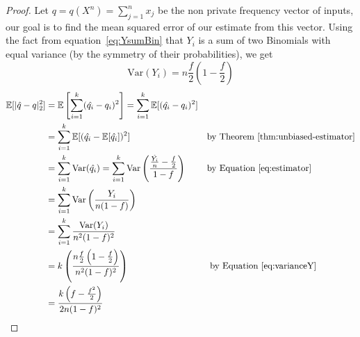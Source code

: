 \documentclass{article}
\begin{document}
\begin{enumerate}
\begin{proof}
Let $q = q(X^n)=\sum\limits_{j=1}^n x_j$ be the non private frequency vector of inputs, our goal is to find the mean squared error of our estimate from this vector. Using the fact from equation~\ref{eq:YsumBin} that $Y_i$ is a sum of two Binomials with equal variance (by the symmetry of their probabilities), we get
\begin{equation}
\label{eq:varianceY}
    \text{Var}(Y_i)=n\frac{f}{2}\left(1-\frac{f}{2}\right)
\end{equation}
	\begin{align*}
		\mathbb{E}[|\hat{q}-q|_2^2] &= \mathbb{E}\left[\sum\limits_{i=1}^k(\hat{q_i}-q_i)^2\right] = \sum\limits_{i=1}^k\mathbb{E}[(\hat{q_i}-q_i)^2] &&\\
			&= \sum\limits_{i=1}^k\mathbb{E}[(\hat{q_i}-\mathbb{E}[\hat{q_i}])^2] && \text{by Theorem~\ref{thm:unbiased-estimator}}\\
			&= \sum\limits_{i=1}^k\text{Var}(\hat{q_i}) = \sum\limits_{i=1}^k\text{Var}\left(\frac{\frac{\hat{Y_i}}{n}-\frac{f}{2}}{1-f}\right)&&\text{by Equation~\ref{eq:estimator}}\\
			&= \sum\limits_{i=1}^k\text{Var}\left(\frac{Y_i}{n(1-f)}\right) &&\\
			&= \sum\limits_{i=1}^k\frac{\text{Var}(Y_i)}{n^2(1-f)^2}&&\\
			&= k\left(\frac{n\frac{f}{2}\left(1-\frac{f}{2}\right)}{n^2(1-f)^2}\right) &&\text{ by Equation~\ref{eq:varianceY}}\\
			& = \frac{k\left(f-\frac{f^2}{2}\right)}{2n(1-f)^2}
	\end{align*}
	
\end{proof}
\end{enumerate}



\end{document}
